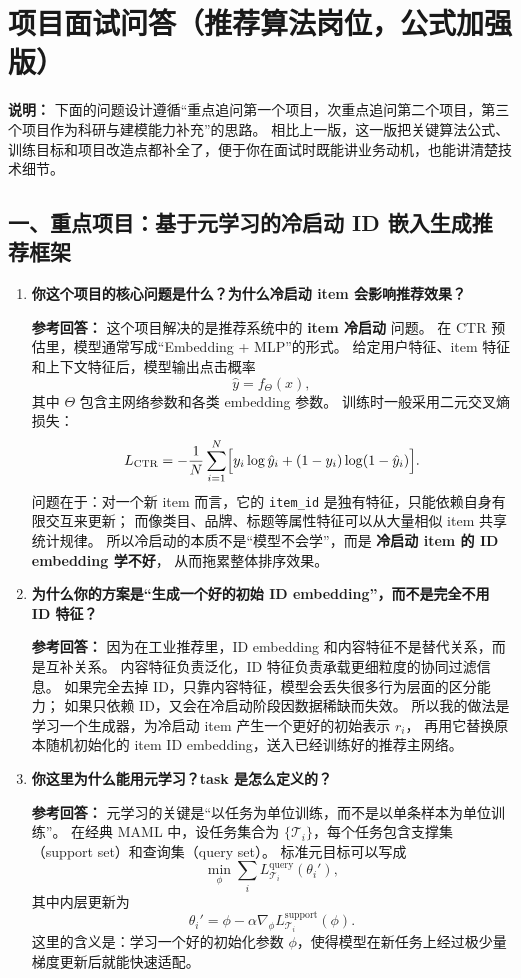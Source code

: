 \documentclass[11pt,a4paper]{ctexart}
\begin{document}
\section*{项目面试问答（推荐算法岗位，公式加强版）}

\textbf{说明：}
下面的问题设计遵循“重点追问第一个项目，次重点追问第二个项目，第三个项目作为科研与建模能力补充”的思路。
相比上一版，这一版把关键算法公式、训练目标和项目改造点都补全了，便于你在面试时既能讲业务动机，也能讲清楚技术细节。

\subsection*{一、重点项目：基于元学习的冷启动 ID 嵌入生成推荐框架}

\begin{enumerate}[leftmargin=*, label=\textbf{Q\arabic*.}]

\item \textbf{你这个项目的核心问题是什么？为什么冷启动 item 会影响推荐效果？}

\textbf{参考回答：}
这个项目解决的是推荐系统中的 \textbf{item 冷启动} 问题。
在 CTR 预估里，模型通常写成“Embedding + MLP”的形式。
给定用户特征、item 特征和上下文特征后，模型输出点击概率
\[
\hat y = f_{\Theta}(x),
\]
其中 $\Theta$ 包含主网络参数和各类 embedding 参数。
训练时一般采用二元交叉熵损失：
\[
L_{\text{CTR}}
=
-\frac{1}{N}\sum_{i=1}^{N}
\Bigl[
y_i \log \hat y_i + (1-y_i)\log(1-\hat y_i)
\Bigr].
\]
问题在于：对一个新 item 而言，它的 \texttt{item\_id} 是独有特征，只能依赖自身有限交互来更新；
而像类目、品牌、标题等属性特征可以从大量相似 item 共享统计规律。
所以冷启动的本质不是“模型不会学”，而是 \textbf{冷启动 item 的 ID embedding 学不好}，
从而拖累整体排序效果。

\item \textbf{为什么你的方案是“生成一个好的初始 ID embedding”，而不是完全不用 ID 特征？}

\textbf{参考回答：}
因为在工业推荐里，ID embedding 和内容特征不是替代关系，而是互补关系。
内容特征负责泛化，ID 特征负责承载更细粒度的协同过滤信息。
如果完全去掉 ID，只靠内容特征，模型会丢失很多行为层面的区分能力；
如果只依赖 ID，又会在冷启动阶段因数据稀缺而失效。
所以我的做法是学习一个生成器，为冷启动 item 产生一个更好的初始表示 $r_i$，
再用它替换原本随机初始化的 item ID embedding，送入已经训练好的推荐主网络。

\item \textbf{你这里为什么能用元学习？task 是怎么定义的？}

\textbf{参考回答：}
元学习的关键是“以任务为单位训练，而不是以单条样本为单位训练”。
在经典 MAML 中，设任务集合为 $\{\mathcal T_i\}$，每个任务包含支撑集（support set）和查询集（query set）。
标准元目标可以写成
\[
\min_{\phi}\sum_{i} L_{\mathcal T_i}^{\text{query}}(\theta_i'),
\]
其中内层更新为
\[
\theta_i' = \phi - \alpha \nabla_{\phi} L_{\mathcal T_i}^{\text{support}}(\phi).
\]
这里的含义是：学习一个好的初始化参数 $\phi$，使得模型在新任务上经过极少量梯度更新后就能快速适配。


\end{enumerate}
\end{document}
